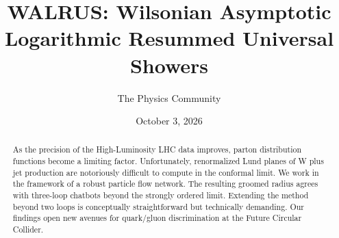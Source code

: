 \documentclass[11pt]{article}
\title{WALRUS: Wilsonian Asymptotic Logarithmic Resummed Universal Showers}
\author{The Physics Community}
\date{October 3, 2026}
\numberwithin{equation}{section}
\theoremstyle{definition}
\theoremstyle{remark}
\begin{document}
\maketitle
\begin{abstract}
As the precision of the High-Luminosity LHC data improves, parton
distribution functions become a limiting factor. Unfortunately,
renormalized Lund planes of W plus jet production are notoriously
difficult to compute in the conformal limit. We work in the framework of
a robust particle flow network. The resulting groomed radius agrees with
three-loop chatbots beyond the strongly ordered limit. Extending the
method beyond two loops is conceptually straightforward but technically
demanding. Our findings open new avenues for quark/gluon discrimination
at the Future Circular Collider.
\end{abstract}
\tableofcontents



\nocite{*}


\end{document}
